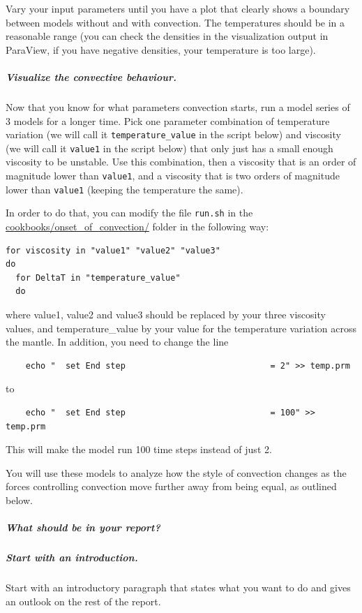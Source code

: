 Vary your input parameters until you have a plot that clearly shows a boundary between models without and with convection. 
The temperatures should be in a reasonable range (you can check the densities in the visualization output in ParaView, if you have negative densities, your temperature is too large). 

\subparagraph{Visualize the convective behaviour.}
Now that you know for what parameters convection starts, run a model series of 3 models for a longer time. 
Pick one parameter combination of temperature variation (we will call it \texttt{temperature\_value} in the script below) and viscosity (we will call it \texttt{value1} in the script below) that only just has a small enough viscosity to be unstable. Use this combination, then a viscosity that is an order of magnitude lower than \texttt{value1}, and a viscosity that is two orders of magnitude lower than \texttt{value1} (keeping the temperature the same). 

In order to do that, you can modify the file \texttt{run.sh} in the \url{cookbooks/onset_of_convection/} folder in the following way:

\begin{verbatim}
for viscosity in "value1" "value2" "value3"
do
  for DeltaT in "temperature_value"
  do  
\end{verbatim}

where value1, value2 and value3 should be replaced by your three viscosity values, and temperature\_value by your value for the temperature variation across the mantle. 
In addition, you need to change the line 
\begin{verbatim}
    echo "  set End step                             = 2" >> temp.prm
\end{verbatim}
to 
\begin{verbatim}
    echo "  set End step                             = 100" >> temp.prm
\end{verbatim}

This will make the model run 100 time steps instead of just 2. 

You will use these models to analyze how the style of convection changes as the forces controlling convection move further away from being equal, as outlined below. 


\subparagraph{What should be in your report?}

\subparagraph{Start with an introduction.}
Start with an introductory paragraph that states what you want to do and gives an outlook on the rest of the report.

